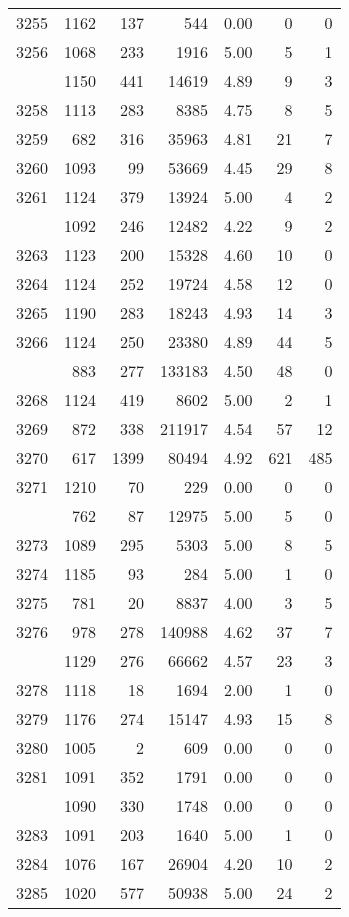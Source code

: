 \documentclass[
]{article}
\begin{document}
\begin{table}
\begin{tabular}[t]{lrrrrrr}
3255 & 1162 & 137 & 544 & 0.00 & 0 & 0\\
3256 & 1068 & 233 & 1916 & 5.00 & 5 & 1\\
\addlinespace
3257 & 1150 & 441 & 14619 & 4.89 & 9 & 3\\
3258 & 1113 & 283 & 8385 & 4.75 & 8 & 5\\
3259 & 682 & 316 & 35963 & 4.81 & 21 & 7\\
3260 & 1093 & 99 & 53669 & 4.45 & 29 & 8\\
3261 & 1124 & 379 & 13924 & 5.00 & 4 & 2\\
\addlinespace
3262 & 1092 & 246 & 12482 & 4.22 & 9 & 2\\
3263 & 1123 & 200 & 15328 & 4.60 & 10 & 0\\
3264 & 1124 & 252 & 19724 & 4.58 & 12 & 0\\
3265 & 1190 & 283 & 18243 & 4.93 & 14 & 3\\
3266 & 1124 & 250 & 23380 & 4.89 & 44 & 5\\
\addlinespace
3267 & 883 & 277 & 133183 & 4.50 & 48 & 0\\
3268 & 1124 & 419 & 8602 & 5.00 & 2 & 1\\
3269 & 872 & 338 & 211917 & 4.54 & 57 & 12\\
3270 & 617 & 1399 & 80494 & 4.92 & 621 & 485\\
3271 & 1210 & 70 & 229 & 0.00 & 0 & 0\\
\addlinespace
3272 & 762 & 87 & 12975 & 5.00 & 5 & 0\\
3273 & 1089 & 295 & 5303 & 5.00 & 8 & 5\\
3274 & 1185 & 93 & 284 & 5.00 & 1 & 0\\
3275 & 781 & 20 & 8837 & 4.00 & 3 & 5\\
3276 & 978 & 278 & 140988 & 4.62 & 37 & 7\\
\addlinespace
3277 & 1129 & 276 & 66662 & 4.57 & 23 & 3\\
3278 & 1118 & 18 & 1694 & 2.00 & 1 & 0\\
3279 & 1176 & 274 & 15147 & 4.93 & 15 & 8\\
3280 & 1005 & 2 & 609 & 0.00 & 0 & 0\\
3281 & 1091 & 352 & 1791 & 0.00 & 0 & 0\\
\addlinespace
3282 & 1090 & 330 & 1748 & 0.00 & 0 & 0\\
3283 & 1091 & 203 & 1640 & 5.00 & 1 & 0\\
3284 & 1076 & 167 & 26904 & 4.20 & 10 & 2\\
3285 & 1020 & 577 & 50938 & 5.00 & 24 & 2\\

\end{tabular}
\end{table}
\end{document}
